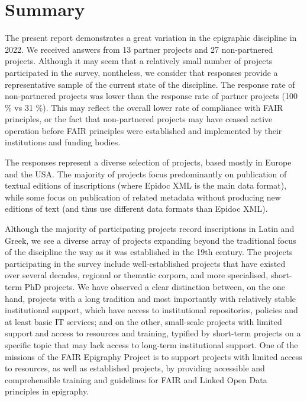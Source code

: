 \documentclass[
  12pt,
]{scrreprt}
\begin{document}
\hypertarget{summary}{%
\chapter{Summary}\label{summary}}

The present report demonstrates a great variation in the epigraphic
discipline in 2022. We received answers from 13 partner projects and 27
non-partnered projects. Although it may seem that a relatively small
number of projects participated in the survey, nontheless, we consider
that responses provide a representative sample of the current state of
the discipline. The response rate of non-partnered projects was lower
than the response rate of partner projects (100 \% vs 31 \%). This may
reflect the overall lower rate of compliance with FAIR principles, or
the fact that non-partnered projects may have ceased active operation
before FAIR principles were established and implemented by their
institutions and funding bodies.

The responses represent a diverse selection of projects, based mostly in
Europe and the USA. The majority of projects focus predominantly on
publication of textual editions of inscriptions (where Epidoc XML is the
main data format), while some focus on publication of related metadata
without producing new editions of text (and thus use different data
formats than Epidoc XML).

Although the majority of participating projects record inscriptions in
Latin and Greek, we see a diverse array of projects expanding beyond the
traditional focus of the discipline the way as it was established in the
19th century. The projects participating in the survey include
well-established projects that have existed over several decades,
regional or thematic corpora, and more specialised, short-term PhD
projects. We have observed a clear distinction between, on the one hand,
projects with a long tradition and most importantly with relatively
stable institutional support, which have access to institutional
repositories, policies and at least basic IT services; and on the other,
small-scale projects with limited support and access to resources and
training, typified by short-term projects on a specific topic that may
lack access to long-term institutional support. One of the missions of
the FAIR Epigraphy Project is to support projects with limited access to
resources, as well as established projects, by providing accessible and
comprehensible training and guidelines for FAIR and Linked Open Data
principles in epigraphy.
\end{document}
